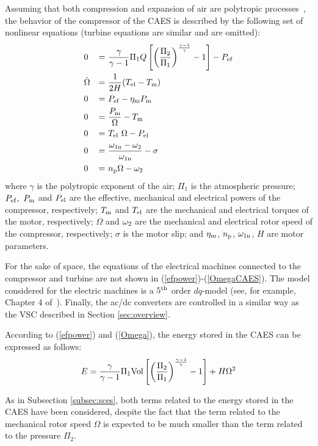 \documentclass[journal, a4paper]{IEEEtran}
\begin{document}
Assuming that both compression and expansion of air are polytropic
processes~\cite{Vongmanee:09}, the behavior of the compressor of the
CAES is described by the following set of nonlinear equations (turbine
equations are similar and are omitted):
\begin{alignat}{3}
  \label{efpower} &0 &=&\ \frac{\gamma}{\gamma-1} \Pi_{1} Q \left[ 
    \left( \frac{\Pi_{2}}{\Pi_{1}} \right)^{\frac{\gamma-1}{\gamma}}
    -1 \right] - P_{\rm ef} \\ 
    \label{Omega} &\dot{\Omega} &=&\ \frac{1}{2H}(T_{\rm el}-T_{\rm m})\\ 
    &0 &=&\ P_{\rm ef} - \eta_{\rm m}P_{\rm m}\\ 
    &0 &=&\ \frac{P_{\rm m}}{\Omega} - T_{\rm m}\\ 
&0 &=&\ T_{\rm el}\ \Omega - P_{\rm el}\\ 
    &0 &=&\ \frac{\omega_{\rm 1n} - \omega_{\rm 2}}{\omega_{\rm 1n}} - \sigma \\
  \label{OmegaCAES}
  &0 &=&\ n_{\rm p} \Omega - \omega_{\rm 2}
\end{alignat}
where $\gamma$ is the polytropic exponent of the air; $\Pi_1$ is the
atmos\-pheric pressure; $P_{\rm ef},\ P_{\rm m}$ and $P_{\rm el}$ are
the effective, mechanical and electrical powers of the compressor,
respectively; $T_{\rm m}$ and $T_{\rm el}$ are the mechanical and
electrical torques of the motor, respectively; $\Omega$ and
$\omega_{\rm 2}$ are the mechanical and electrical rotor speed of the
compressor, respectively; $\sigma$ is the motor slip; 
and $\eta_{\rm m}$, $n_{\rm p}$, $\omega_{\rm 1n}$, 
$H$ are motor parameters.

For the sake of space, the equations of the electrical machines
  connected to the compressor and turbine are not shown in
  (\ref{efpower})-(\ref{OmegaCAES}).  The model considered for the
  electric machines is a $5^{\rm th}$ order $dq$-model (see, for
  example, Chapter 4 of~\cite{Krause:02}).  Finally, the ac/dc
  converters are controlled in a similar way as the VSC described in
  Section \ref{sec:overview}.

According to (\ref{efpower}) and (\ref{Omega}), the energy stored in
the CAES can be expressed as follows:
\begin{equation}
  E=\frac{\gamma}{\gamma -1}\Pi_1 {\rm Vol}
  \left[\left(\frac{\Pi_{2}}{\Pi_{1}}\right)^{\frac{\gamma-1}{\gamma}}
    -1\right] + H \Omega^2
\end{equation} 

As in Subsection \ref{subsec:sces}, both terms related to the energy
stored in the CAES have been considered, despite the fact that the
term related to the mechanical rotor speed $\Omega$ is expected to be
much smaller than the term related to the pressure $\Pi_2$.
\end{document}
